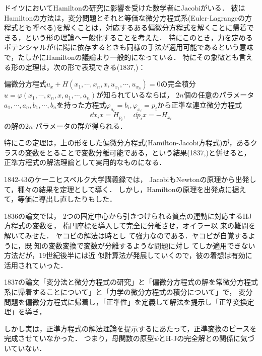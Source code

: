 \documentclass[uplatex,dvipdfmx]{jsreport}
\begin{document}
\begin{history}
    ドイツにおいてHamiltonの研究に影響を受けた数学者にJacobiがいる．
    彼はHamiltonの方法は，変分問題とそれと等価な微分方程式系(Euler-Lagrangeの方程式とも呼べる)を解くことは，対応するある偏微分方程式を解くことに帰着できる，という形の理論へ一般化することを考えた．
    特にこのとき，力を定めるポテンシャルが$t$に陽に依存するときも同様の手法が適用可能であるという意味で，たしかにHamiltonの議論より一般的になっている．
    特にその象徴とも言える形の定理は，次の形で表現できる(1837,\cite{Jacobi37B})：
    \begin{theorem}
        偏微分方程式$u_x+H(x_1,\cdots,x_n,x,u_{x_1},\cdots,u_{x_n})=0$の完全積分$u=\varphi(x_1,\cdots,x_n,x,a_1,\cdots,a_n)$が知られているならば，
        $2n$個の任意のパラメータ$a_1,\cdots,a_n,b_1,\cdots,b_n$を持った方程式$\varphi_{a_i}=b_i,\varphi_{x_i}=p_i$から正準な連立微分方程式
        \[\dd{x_i}{x}=H_{p_i},\quad\dd{p_i}{x}=-H_{x_i}\]
        の解の$2n$-パラメータの群が得られる．
    \end{theorem}
    特にこの定理は，上の形をした偏微分方程式(Hamilton-Jacobi方程式)が，あるクラスの変数をとることで変数分離可能である，という結果(1837,\cite{Jacobi37C})と併せると，
    正準方程式の解法理論として実用的なものになる．

    1842-43のケーニヒスベルク大学講義録では，
    JacobiもNewtonの原理から出発して，種々の結果を定理として導く．
    しかし，Hamiltonの原理を出発点に据えて，等価に導出し直したりもした．

    1836の論文\cite{Jacobi36}では，
    2つの固定中心から引きつけられる質点の運動に対応するHJ方程式の変数を，
    楕円座標を導入して完全に分離させ，オイラー以
    来の難問を解いてみせた．
    ヤコビの解法は時とし
    て強力なのである．ヤコビが自覚するように，既
    知の変数変換で変数が分離するような問題に対し
    てしか適用できない方法だが，19世紀後半には近
    似計算法が発展していくので，彼の着想は有効に
    活用されていった．

    1837の論文\cite{Jacobi37}「変分法と微分方程式の研究」と「偏微分方程式の解を常微分方程式系に帰着することについて」と「力学の微分方程式の積分について」で，
    変分問題を偏微分方程式に帰着し，「正準性」を定義して解法を提示し「正準変換定理」を導き，
\end{history}

\begin{remarks}
    しかし実は，正準方程式の解法理論を提示するにあたって，正準変換のピースを完成させていなかった．
    つまり，母関数の原型$\psi$とH-Jの完全解との関係に気づいていない．
\end{remarks}
\end{document}
